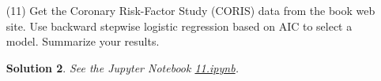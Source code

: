 \documentclass[10pt]{article}
\newtheorem*{sol}{Solution}
\begin{document}
\begin{enumerate}
\begin{sol}
In this case, up to addition of a constant not depending on $\hat \beta$,
the AIC is
\[
\text{AIC} = \ell_S - |S| = -n\log \sigma - \frac{1}{2\sigma^2}\sum_{i=1}^n
(Y_i - (X \hat \beta)_i)^2 - |S|.
\]
Mallow's $C_p$ statistic is
\[
\hat R_{\text{tr}}(S) + 2 |S| \sigma^2 = \sum_{i=1}^n (Y_i - (X \hat \beta)_i)^2 +
2 |S|\sigma^2.
\]
Thus, up to a adding a constant to $\text{AIC}$, which doesn't affect where the maximum
$\text{AIC}$ is achieved, we have $C_p = - 2\sigma^2 \text{AIC}$. So the $\hat \beta$
which maximizes $\text{AIC}$ is the same as the $\hat \beta$ which minimizes $C_p$.
\end{sol}

\item[(11)] Get the Coronary Risk-Factor Study (CORIS) data from the book web
site. Use backward stepwise logistic regression based on AIC to select a
model. Summarize your results.

\begin{sol}
See the Jupyter Notebook
\href{https://github.com/ajrasmus/some_of_statistics/blob/main/chapter_13/11.ipynb}{11.ipynb}.
\end{sol}

\end{enumerate}
\end{document}
